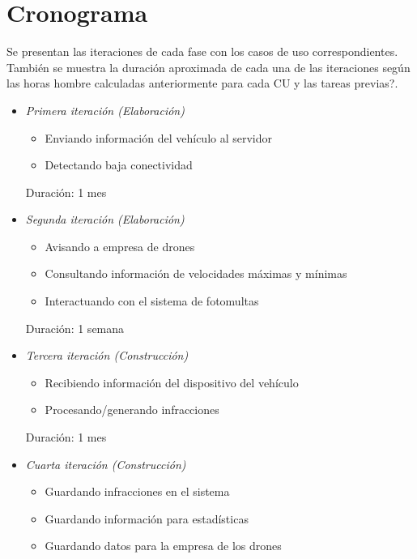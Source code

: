 \section{Cronograma}

Se presentan las iteraciones de cada fase con los casos de uso correspondientes. 
También se muestra la duración aproximada de cada una de las iteraciones según las
horas hombre calculadas anteriormente para cada CU y las tareas previas?.

\begin{itemize}

\item \textit{Primera iteración (Elaboración)}
\begin{itemize}
\item Enviando información del vehículo al servidor
\item Detectando baja conectividad
\end{itemize}

Duración: 1 mes

\item \textit{Segunda iteración (Elaboración)}
\begin{itemize}
\item Avisando a empresa de drones
\item Consultando información de velocidades máximas y mínimas
\item Interactuando con el sistema de fotomultas
\end{itemize}

Duración: 1 semana

\item \textit{Tercera iteración (Construcción)}
\begin{itemize}
\item Recibiendo información del dispositivo del vehículo
\item Procesando/generando infracciones
\end{itemize}

Duración: 1 mes

\item \textit{Cuarta iteración (Construcción)}
\begin{itemize}
\item Guardando infracciones en el sistema 
\item Guardando información para estadísticas 
\item Guardando datos para la empresa de los drones 
\end{itemize}


\end{itemize}
